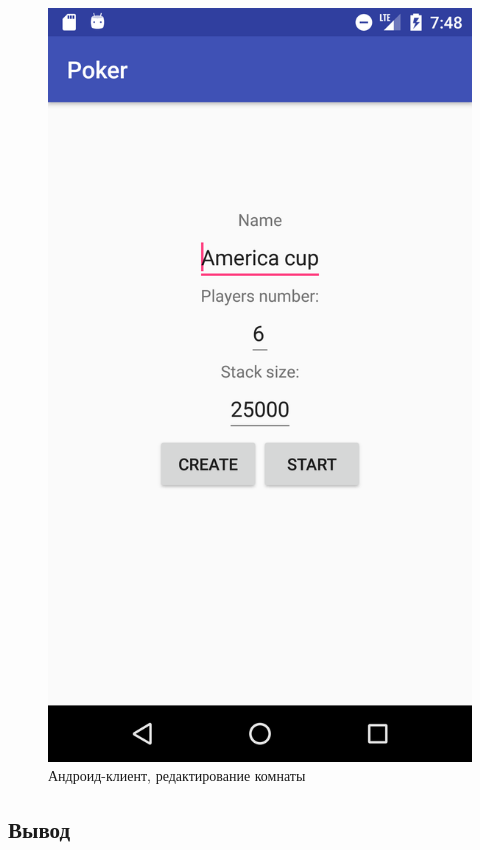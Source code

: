 \begin{figure}[H]
	\begin{center}
		\includegraphics[scale=0.15]{pics/andr3}
	    \caption{Андроид-клиент, редактирование комнаты} 
		\label{pic:andr:3}
	\end{center}
\end{figure}



\subsection*{Вывод}

